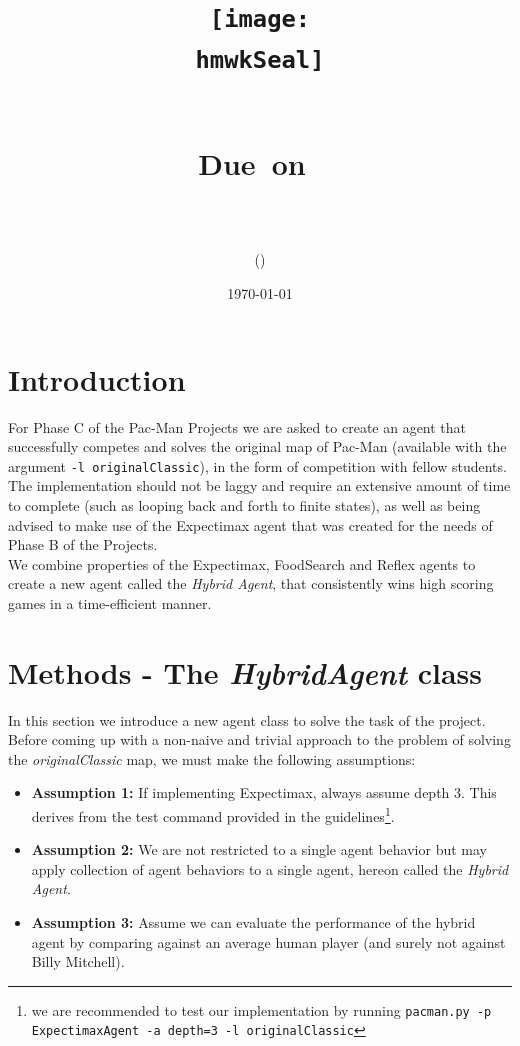 \documentclass{article}
\title{
	\centering
	\texttt{[image: \\hmwkSeal]}
	
	\vspace{1in}
	\textmd{\textbf{\hmwkClass\ \hmwkTitle}}\\
	
	\normalsize\vspace{0.1in}\small{Due\ on\ \hmwkDueDate}\\
	
	\vspace{0.1in}
	\large{\textit{\hmwkClassInstructor}} \\
	\vspace{0.5in}
	
	\large{\hmwkUniversity}
	
	\vspace{3in}
	
	\author{\textbf{\hmwkAuthorName} (\hmwkAuthorID)}
	\date{\today}
}
\def\code#1{\texttt{#1}}
\begin{document}
	
	\maketitle
	
	\pagebreak
	
	\section{Introduction}
	
	For Phase C of the Pac-Man Projects we are asked to create an agent that successfully competes and solves the original map of Pac-Man (available with the argument \code{-l originalClassic}), in the form of competition with fellow students. The implementation should not be laggy and require an extensive amount of time to complete (such as looping back and forth to finite states), as well as being advised to make use of the Expectimax agent that was created for the needs of Phase B of the Projects. \\
	
	We combine properties of the Expectimax, FoodSearch and Reflex agents to create a new agent called the \textit{Hybrid Agent}, that consistently wins high scoring games in a time-efficient manner. \\
	
	\tableofcontents
	\listoffigures
	
	\newpage
	
	\section{Methods - The \textit{HybridAgent} class}
	
	In this section we introduce a new agent class to solve the task of the project. Before coming up with a non-naive and trivial approach to the problem of solving the \textit{originalClassic} map, we must make the following assumptions:
		
	\begin{itemize}
		\item \textbf{Assumption 1:} If implementing Expectimax, always assume depth 3. This derives from the test command provided in  the guidelines\footnote{we are recommended to test our implementation by running \code{pacman.py -p ExpectimaxAgent -a depth=3 -l originalClassic}}. 
		\item \textbf{Assumption 2:} We are not restricted to a single agent behavior but may apply collection of agent behaviors to a single agent, hereon called the \textit{Hybrid Agent}.
		\item \textbf{Assumption 3:} Assume we can evaluate the performance of the hybrid agent by comparing against an average human player (and surely not against Billy Mitchell).
	\end{itemize}
	
\end{document}
